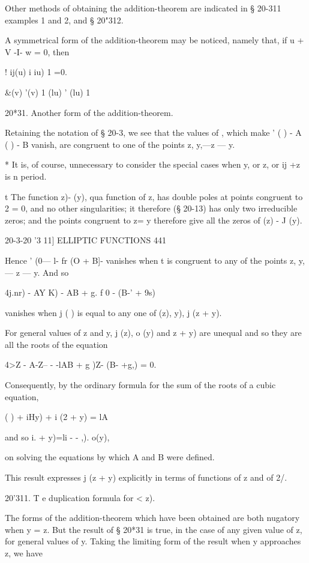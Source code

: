 {Other methods of obtaining the addition-theorem are indicated in §
20-311 examples 1 and 2, and § 20"312.

A symmetrical form of the addition-theorem may be noticed, namely
that, if u + V -I- w = 0, then

! ij(u) i iu) 1 =0.

\&(v) '(v) 1 (lu) ' (lu) 1

20*31. Another form of the addition-theorem.

Retaining the notation of § 20-3, we see that the values of , which
make ' ( ) - A ( ) - B vanish, are congruent to one of the points z,
y,—z — y.

* It is, of course, unnecessary to consider the special cases when y,
or z, or ij +z is n period.

t The function z)- (y), qua function of z, has double poles at points
congruent to 2 = 0, and no other singularities; it therefore (§
20-13) has only two irreducible zeros; and the points congruent to z=
y therefore give all the zeros of (z) - J (y).

20-3-20 '3 11] ELLIPTIC FUNCTIONS 441

Hence ' (0— l- fr (O + B]- vanishes when t is congruent to any of the
points z, y, — z — y. And so

4j.nr) - AY K) - AB + g. f 0 - (B-' + 9s)

vanishes when j ( ) is equal to any one of (z), y), j (z + y).

For general values of z and y, j (z), o (y) and z + y) are unequal and
so they are all the roots of the equation

4>Z - A-Z-- - -lAB + g )Z- (B- +g,) = 0.

Consequently, by the ordinary formula for the sum of the roots of a
cubic equation,

 ( ) + iHy) + i (2 + y) = lA%

and so i. + y)=li - - ,). o(y),

on solving the equations by which A and B were defined.

This result expresses j (z + y) explicitly in terms of functions of z
and of 2/.

20'311. T e duplication formula for < z).

The forms of the addition-theorem which have been obtained are both
nugatory when y = z. But the result of § 20*31 is true, in the case of
any given value of z, for general values of y. Taking the limiting
form of the result when y approaches z, we have

}
